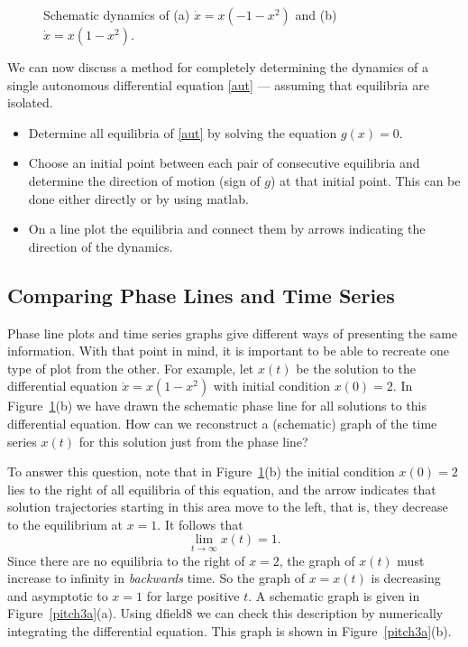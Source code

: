 \documentclass{ximera}
\begin{document}
\begin{figure}[htb]
       \centerline{%
	}
\caption{Schematic dynamics of (a) $\dot{x}=x(-1-x^2)$ and (b) $\dot{x}=x(1-x^2)$.}
\label{pitch3}
\end{figure}

We can now discuss a method for completely determining the
dynamics of a single autonomous differential equation \eqref{aut}
--- assuming that equilibria are isolated.

\begin{itemize}
\item Determine all equilibria of \eqref{aut} by solving the
equation $g(x)=0$.
\item Choose an initial point between each pair of consecutive
equilibria and determine the direction of motion (sign of $g$) at
that initial point. This can be done either directly or by using
{\sf matlab}.
\item On a line plot the equilibria  and
connect them by arrows indicating the direction of the dynamics.
\end{itemize}




\subsection*{Comparing Phase Lines and Time Series}

Phase line plots and time series graphs give different ways of
presenting the same information.  With that point in mind, it is
important to be able to recreate one type of plot from
the other.  For example, let $x(t)$ be the solution to the
differential equation $\dot{x}=x(1-x^2)$ with initial condition $x(0)=2$.
In Figure~\ref{pitch3}(b) we have drawn the schematic phase line for
all solutions to this differential equation. How can we reconstruct
a (schematic) graph of the time series $x(t)$ for this solution just
from the phase line?

To answer this question, note that in Figure~\ref{pitch3}(b) the
initial condition $x(0)=2$ lies to the right of all equilibria of
this equation, and the arrow indicates that solution trajectories
starting in this area move to the left, that is, they decrease to
the equilibrium at $x=1$.  It follows that
\[
\lim_{t\to\infty} x(t) = 1.
\]
Since there are no equilibria to the right of $x=2$, the graph of $x(t)$
must increase to infinity in {\em backwards\/} time.  So the graph of 
$x=x(t)$ is decreasing and asymptotic to $x=1$ for large positive $t$.  
A schematic graph is given in Figure~\ref{pitch3a}(a).  Using {\sf dfield8} 
we can check this description by numerically integrating the differential
equation.   This graph is shown in Figure~\ref{pitch3a}(b).
\end{document}
